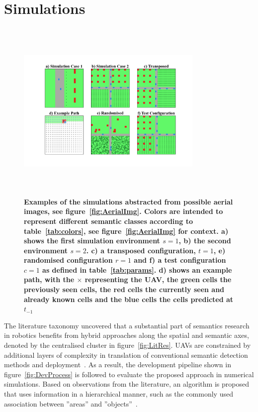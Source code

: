 \documentclass[twocolumn,letterpaper]{IEEEAerospaceCLS}  %
\begin{document}
\section{Simulations} \label{sec:Sim}
\begin{figure}[t]
    \centering
    \includegraphics[width=0.8\textwidth,height=3.5in]{SimComp14-TNR.png}
    \caption{\bf{
        Examples of the simulations abstracted from possible aerial images, see figure~\ref{fig:AerialImg}. Colors are intended to represent different semantic classes according to table~\ref{tab:colors}, see figure~\ref{fig:AerialImg} for context. a) shows the first simulation environment $s=1$, b) the second environment $s=2$. c) a transposed configuration, $t=1$, e) randomised configuration $r=1$ and f) a test configuration $c=1$ as defined in table~\ref{tab:params}. d) shows an example path, with the $\times$ representing the UAV, the green cells the previously seen cells, the red cells the currently seen and already known cells and the blue cells the cells predicted at $t_{-1}$ 
    }}
    \label{fig:SimCase}
\end{figure}
The literature taxonomy uncovered that a substantial part of semantics research in robotics benefits from hybrid approaches along the spatial and semantic axes, denoted by the centralised cluster in figure~\ref{fig:LitRes}. UAVs are constrained by additional layers of complexity in translation of conventional semantic detection methods and deployment~\cite{mandel_method_2020}. As a result, the development pipeline shown in figure~\ref{fig:DevProcess} is followed to evaluate the proposed approach in numerical simulations. Based on observations from the literature, an algorithm is proposed that uses information in a hierarchical manner, such as the commonly used association between ''areas'' and ''objects''~\cite{tenorth_knowrob-map_2010,galindo_robot_2008,chaplot_object_2020,wu_learning_2018}.
\end{document}

